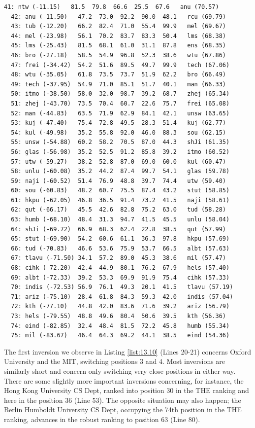 \begin{lstlisting}[caption={Comparing the robust \NetFlows ranking with the THE ranking},label=list:13.10]
  41: ntw (-11.15)   81.5  79.8  66.6  25.5  67.6   anu (70.57)
  42: anu (-11.50)   47.2  73.0  92.2  90.0  48.1   rcu (69.79)
  43: tub (-12.20)   66.2  82.4  71.0  55.4  99.9   mel (69.67)
  44: mel (-23.98)   56.1  70.2  83.7  83.3  50.4   lms (68.38)
  45: lms (-25.43)   81.5  68.1  61.0  31.1  87.8   ens (68.35)
  46: bro (-27.18)   58.5  54.9  96.8  52.3  38.6   wtu (67.86)
  47: frei (-34.42)  54.2  51.6  89.5  49.7  99.9   tech (67.06)
  48: wtu (-35.05)   61.8  73.5  73.7  51.9  62.2   bro (66.49)
  49: tech (-37.95)  54.9  71.0  85.1  51.7  40.1   man (66.33)
  50: itmo (-38.50)  58.0  32.0  98.7  39.2  68.7   zhej (65.34)
  51: zhej (-43.70)  73.5  70.4  60.7  22.6  75.7   frei (65.08)
  52: man (-44.83)   63.5  71.9  62.9  84.1  42.1   unsw (63.65)
  53: kuj (-47.40)   75.4  72.8  49.5  28.3  51.4   kuj (62.77)
  54: kul (-49.98)   35.2  55.8  92.0  46.0  88.3   sou (62.15)
  55: unsw (-54.88)  60.2  58.2  70.5  87.0  44.3   shJi (61.35)
  56: glas (-56.98)  35.2  52.5  91.2  85.8  39.2   itmo (60.52)
  57: utw (-59.27)   38.2  52.8  87.0  69.0  60.0   kul (60.47)
  58: unlu (-60.08)  35.2  44.2  87.4  99.7  54.1   glas (59.78)
  59: naji (-60.52)  51.4  76.9  48.8  39.7  74.4   utw (59.40)
  60: sou (-60.83)   48.2  60.7  75.5  87.4  43.2   stut (58.85)
  61: hkpu (-62.05)  46.8  36.5  91.4  73.2  41.5   naji (58.61)
  62: qut (-66.17)   45.5  42.6  82.8  75.2  63.0   tud (58.28)
  63: humb (-68.10)  48.4  31.3  94.7  41.5  45.5   unlu (58.04)
  64: shJi (-69.72)  66.9  68.3  62.4  22.8  38.5   qut (57.99)
  65: stut (-69.90)  54.2  60.6  61.1  36.3  97.8   hkpu (57.69)
  66: tud (-70.83)   46.6  53.6  75.9  53.7  66.5   albt (57.63)
  67: tlavu (-71.50) 34.1  57.2  89.0  45.3  38.6   mil (57.47)
  68: cihk (-72.20)  42.4  44.9  80.1  76.2  67.9   hels (57.40)
  69: albt (-72.33)  39.2  53.3  69.9  91.9  75.4   cihk (57.33)
  70: indis (-72.53) 56.9  76.1  49.3  20.1  41.5   tlavu (57.19)
  71: ariz (-75.10)  28.4  61.8  84.3  59.3  42.0   indis (57.04)
  72: kth (-77.10)   44.8  42.0  83.6  71.6  39.2   ariz (56.79)
  73: hels (-79.55)  48.8  49.6  80.4  50.6  39.5   kth (56.36)
  74: eind (-82.85)  32.4  48.4  81.5  72.2  45.8   humb (55.34)
  75: mil (-83.67)   46.4  64.3  69.2  44.1  38.5   eind (54.36)
\end{lstlisting}

The first inversion we observe in Listing \ref{list:13.10} (Lines 20-21) concerns Oxford University and the MIT, switching positions 3 and 4. Most inversions are similarly short and concern only switching very close positions in either way. There are some slightly more important inversions concerning, for instance, the Hong Kong University CS Dept, ranked into position 30 in the THE ranking and here in the position 36 (Line 53). The opposite situation may also happen; the Berlin Humboldt University CS Dept, occupying the 74th position in the THE ranking, advances in the robust \NetFlows ranking to position 63 (Line 80).

